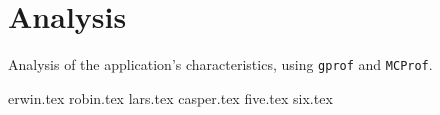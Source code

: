 \documentclass[final]{article}
\begin{document}
\section{Analysis}
Analysis of the application's characteristics, using \texttt{gprof} and \texttt{MCProf}.

{erwin.tex}
{robin.tex}
{lars.tex}
{casper.tex}
{five.tex}
{six.tex}
\end{document}
